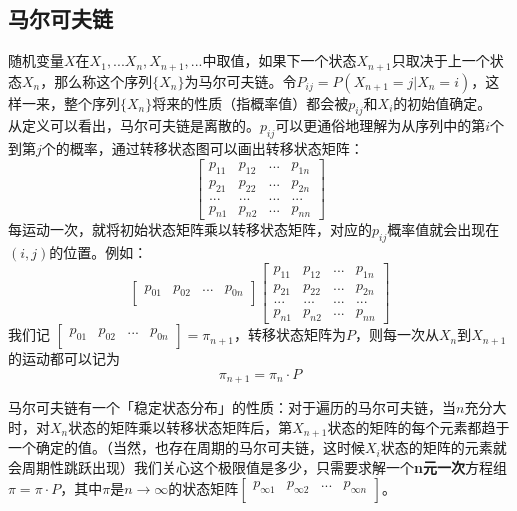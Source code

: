 \documentclass[11pt,a4paper]{article}
\begin{document}
\subsection{马尔可夫链}
随机变量$X$在${X_1,...X_n,X_{n+1},...}$中取值，如果下一个状态$X_{n+1}$只取决于上一个状态$X_n$，那么称这个序列$\{X_n\}$为马尔可夫链。令$P_{ij}=P(X_{n+1}=j|X_n=i)$，这样一来，整个序列$\{X_n\}$将来的性质（指概率值）都会被$p_{ij}$和$X_i$的初始值确定。\\
\indent\setlength{\parindent}{2em}从定义可以看出，马尔可夫链是离散的。$p_{ij}$可以更通俗地理解为从序列中的第$i$个到第$j$个的概率，通过转移状态图可以画出转移状态矩阵：
\begin{equation*}
	\begin{bmatrix}
		p_{11}&p_{12}&...&p_{1n} \\
		p_{21}&p_{22}&...&p_{2n} \\
		...&...&...&...\\
		p_{n1}&p_{n2}&...&p_{nn}
	\end{bmatrix}
\end{equation*}
每运动一次，就将初始状态矩阵乘以转移状态矩阵，对应的$p_{ij}$概率值就会出现在$(i,j)$的位置。例如：\\
\begin{equation*}
	\begin{bmatrix}
		p_{01}&p_{02}&...&p_{0n} \\
	\end{bmatrix}
	\begin{bmatrix}
		p_{11}&p_{12}&...&p_{1n} \\
		p_{21}&p_{22}&...&p_{2n} \\
		...&...&...&...\\
		p_{n1}&p_{n2}&...&p_{nn}
	\end{bmatrix}
\end{equation*}
我们记
$\begin{bmatrix}
	p_{01}&p_{02}&...&p_{0n} \\
\end{bmatrix}=\pi_{n+1}$，转移状态矩阵为$P$，则每一次从$X_{n}$到$X_{n+1}$的运动都可以记为
\begin{equation*}
	\pi_{n+1}=\pi_n\cdot P
\end{equation*}

马尔可夫链有一个「稳定状态分布」的性质：对于遍历的马尔可夫链，当$n$充分大时，对$X_n$状态的矩阵乘以转移状态矩阵后，第$X_{n+1}$状态的矩阵的每个元素都趋于一个确定的值。（当然，也存在周期的马尔可夫链，这时候$X_i$状态的矩阵的元素就会周期性跳跃出现）我们关心这个极限值是多少，只需要求解一个\textbf{n元一次}方程组$\pi=\pi\cdot P$，其中$\pi$是$n \to \infty$的状态矩阵$\begin{bmatrix}
	p_{\infty1}&p_{\infty2}&...&p_{\infty n} \\
\end{bmatrix}$。
\end{document}
